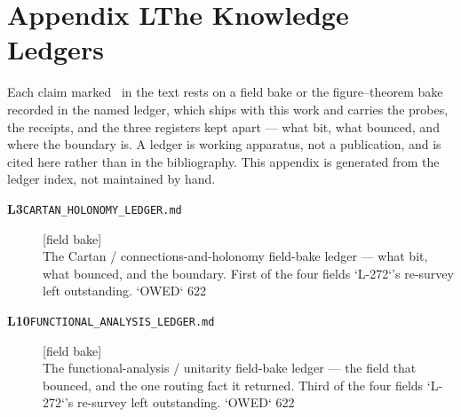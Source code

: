\clearpage
\section*{Appendix L\quad The Knowledge Ledgers}\label{app:ledgers}
\small\noindent Each claim marked \ldgmarker\ in the text rests on a field bake or the figure--theorem bake recorded in the named ledger, which ships with this work and carries the probes, the receipts, and the three registers kept apart --- what bit, what bounced, and where the boundary is. A ledger is working apparatus, not a publication, and is cited here rather than in the bibliography. This appendix is generated from the ledger index, not maintained by hand.\par\medskip
\begingroup\renewcommand{\arraystretch}{1.25}
\begin{description}
\item[\textbf{L3}\quad\texttt{CARTAN\_HOLONOMY\_LEDGER.md}]\hfill\textsf{[field bake]}\\
The Cartan / connections-and-holonomy field-bake ledger --- what bit, what bounced, and the boundary. First of the four fields `L-272`'s re-survey left outstanding. `OWED` 622
\item[\textbf{L10}\quad\texttt{FUNCTIONAL\_ANALYSIS\_LEDGER.md}]\hfill\textsf{[field bake]}\\
The functional-analysis / unitarity field-bake ledger --- the field that bounced, and the one routing fact it returned. Third of the four fields `L-272`'s re-survey left outstanding. `OWED` 622
\end{description}
\endgroup
